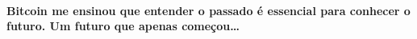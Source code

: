 \paragraph{Bitcoin me ensinou que entender o passado é essencial para conhecer o futuro. Um futuro que apenas começou\ldots}

%
%
%
%
%
